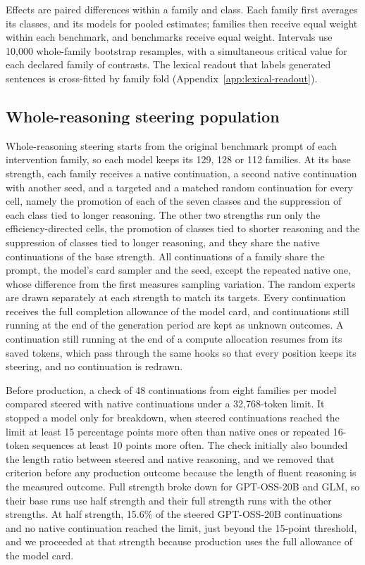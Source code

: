 Effects are paired differences within a family and class.
%
Each family first averages its classes, and its models for pooled estimates; families then receive equal weight within each benchmark, and benchmarks receive equal weight.
%
Intervals use 10,000 whole-family bootstrap resamples, with a simultaneous critical value for each declared family of contrasts.
%
The lexical readout that labels generated sentences is cross-fitted by family fold (Appendix~\ref{app:lexical-readout}).
%

\subsection{Whole-reasoning steering population}
\label{sec:whole-setup}

Whole-reasoning steering starts from the original benchmark prompt of each intervention family, so each model keeps its 129, 128 or 112 families.
%
At its base strength, each family receives a native continuation, a second native continuation with another seed, and a targeted and a matched random continuation for every cell, namely the promotion of each of the seven classes and the suppression of each class tied to longer reasoning.
%
The other two strengths run only the efficiency-directed cells, the promotion of classes tied to shorter reasoning and the suppression of classes tied to longer reasoning, and they share the native continuations of the base strength.
%
All continuations of a family share the prompt, the model's card sampler and the seed, except the repeated native one, whose difference from the first measures sampling variation.
%
The random experts are drawn separately at each strength to match its targets.
%
Every continuation receives the full completion allowance of the model card, and continuations still running at the end of the generation period are kept as unknown outcomes.
%
A continuation still running at the end of a compute allocation resumes from its saved tokens, which pass through the same hooks so that every position keeps its steering, and no continuation is redrawn.
%

Before production, a check of 48 continuations from eight families per model compared steered with native continuations under a 32,768-token limit.
%
It stopped a model only for breakdown, when steered continuations reached the limit at least 15 percentage points more often than native ones or repeated 16-token sequences at least 10 points more often.
%
The check initially also bounded the length ratio between steered and native reasoning, and we removed that criterion before any production outcome because the length of fluent reasoning is the measured outcome.
%
Full strength broke down for GPT-OSS-20B and GLM, so their base runs use half strength and their full strength runs with the other strengths.
%
At half strength, 15.6\% of the steered GPT-OSS-20B continuations and no native continuation reached the limit, just beyond the 15-point threshold, and we proceeded at that strength because production uses the full allowance of the model card.
%

